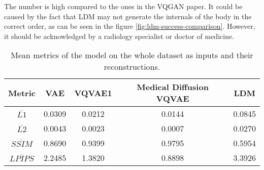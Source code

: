 The number is high compared to the ones in the VQGAN paper\cite{esser2021tamingtransformershighresolutionimage}. It could be caused by the fact that LDM may not generate the internals of the body in the correct order, as can be seen in the figure \ref{fig:ldm-success-comparison}. However, it should be acknowledged by a radiology specialist or doctor of medicine.
\begin{table}[h!]
\centering
\begin{tabular}{|c|c|c|c|c|}
\hline
\textbf{Metric} & VAE & VQVAE1 & Medical Diffusion VQVAE & \textbf{LDM} \\
\hline
$\overline{L1}$ & 0.0309 & 0.0212 & 0.0144 & 0.0845 \\
\hline
$\overline{L2}$ & 0.0043 & 0.0023 & 0.0007 & 0.0270 \\
\hline
$\overline{SSIM}$ & 0.8690 & 0.9399 & 0.9795 & 0.5954 \\
\hline
$\overline{LPIPS}$ & 2.2485 & 1.3820 & 0.8898 & 3.3926 \\
\hline
\end{tabular}
\caption{Mean metrics of the model on the whole dataset as inputs and their reconstructions.}
\label{table:metrics}
\end{table}


% 